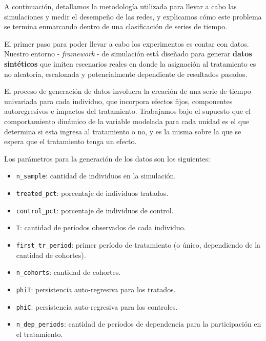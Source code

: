 \documentclass[../main.tex]{subfiles}
\begin{document}
A continuación, detallamos la metodología utilizada para llevar a cabo las simulaciones y medir el desempeño de las redes, y explicamos cómo este problema se termina enmarcando dentro de una clasificación de series de tiempo.

El primer paso para poder llevar a cabo los experimentos es contar con datos. Nuestro entorno - \textit{framework} - de simulación está diseñado para generar \textbf{datos sintéticos} que imiten escenarios reales en donde la asignación al tratamiento es no aleatoria, escalonada y potencialmente dependiente de resultados pasados.

El proceso de generación de datos involucra la creación de una serie de tiempo univariada para cada individuo, que incorpora efectos fijos, componentes autoregresivos e impactos del tratamiento. Trabajamos bajo el supuesto que el comportamiento dinámico de la variable modelada para cada unidad es el que determina si esta ingresa al tratamiento o no, y es la misma sobre la que se espera que el tratamiento tenga un efecto.

Los parámetros para la generación de los datos son los siguientes:
\begin{itemize}
    \setlength{\itemsep}{0pt}
    \item \texttt{n\_sample}: cantidad de individuos en la simulación.
    \item \texttt{treated\_pct}: porcentaje de individuos tratados.
    \item \texttt{control\_pct}: porcentaje de individuos de control.
    \item \texttt{T}: cantidad de períodos observados de cada individuo.
    \item \texttt{first\_tr\_period}: primer período de tratamiento (o único, dependiendo de la cantidad de cohortes).
    \item \texttt{n\_cohorts}: cantidad de cohortes.
    \item \texttt{phiT}: persistencia auto-regresiva para los tratados.
    \item \texttt{phiC}: persistencia auto-regresiva para los controles.
    \item \texttt{n\_dep\_periods}: cantidad de períodos de dependencia para la participación en el tratamiento.
\end{itemize}
\end{document}
